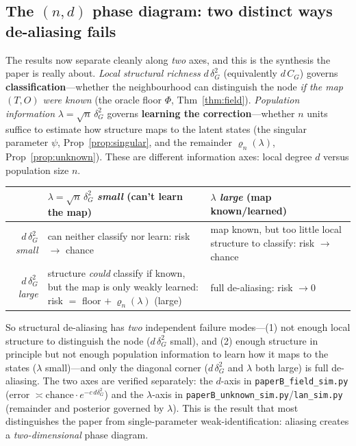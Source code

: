 \documentclass[11pt]{article}
\begin{document}
\subsection{The $(n,d)$ phase diagram: two distinct ways de-aliasing fails}\label{sec:phase}
The results now separate cleanly along \emph{two} axes, and this is the synthesis the paper is really about.
\emph{Local structural richness} $d\,\delta_G^2$ (equivalently $d\,C_G$) governs \textbf{classification}---whether
the neighbourhood can distinguish the node \emph{if the map $(T,O)$ were known} (the oracle floor
$\Phi$, Thm~\ref{thm:field}). \emph{Population information} $\lambda=\sqrt n\,\delta_G^2$ governs
\textbf{learning the correction}---whether $n$ units suffice to estimate how structure maps to the latent states
(the singular parameter $\psi$, Prop~\ref{prop:singular}, and the remainder $\varrho_n(\lambda)$,
Prop~\ref{prop:unknown}). These are different information axes: local degree $d$ versus population size $n$.
\begin{center}\small
\begin{tabular}{r|p{5.4cm}|p{5.4cm}}
 & $\lambda=\sqrt n\,\delta_G^2$ \emph{small} (can't learn the map) & $\lambda$ \emph{large} (map known/learned) \\ \hline
$d\,\delta_G^2$ \emph{small} & can neither classify nor learn: risk $\to$ chance & map known, but too little local structure to classify: risk $\to$ chance \\ \hline
$d\,\delta_G^2$ \emph{large} & structure \emph{could} classify if known, but the map is only weakly learned: risk $=$ floor $+\ \varrho_n(\lambda)$ (large) & full de-aliasing: risk $\to0$ \\
\end{tabular}
\end{center}
So structural de-aliasing has \emph{two} independent failure modes---(1) not enough local structure to
distinguish the node ($d\,\delta_G^2$ small), and (2) enough structure in principle but not enough population
information to learn how it maps to the states ($\lambda$ small)---and only the diagonal corner
($d\,\delta_G^2$ and $\lambda$ both large) is full de-aliasing. The two axes are verified separately: the $d$-axis
in \texttt{paperB\_field\_sim.py} (error $\asymp\text{chance}\cdot e^{-c\,d\delta_G^2}$) and the $\lambda$-axis in
\texttt{paperB\_unknown\_sim.py}/\texttt{lan\_sim.py} (remainder and posterior governed by $\lambda$). This is the
result that most distinguishes the paper from single-parameter weak-identification: aliasing creates a
\emph{two-dimensional} phase diagram.
\end{document}

